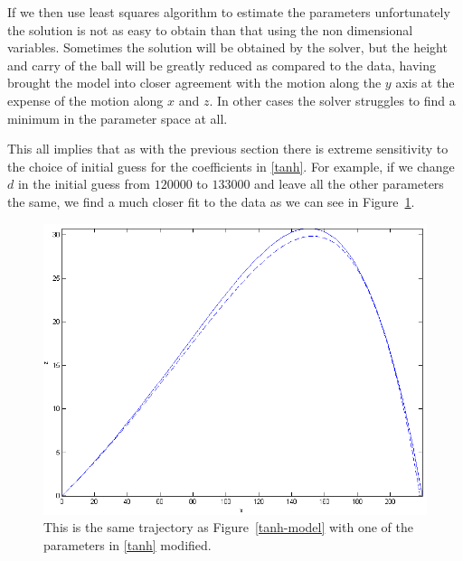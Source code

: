 If we then use least squares algorithm to estimate the parameters unfortunately the solution is not as easy to
obtain than that using the non dimensional variables. Sometimes the solution will be obtained
by the solver, but the height and carry of the ball will be greatly reduced as compared to the data, 
having brought the model into closer agreement with the motion along the $y$ axis at the expense of
the motion along $x$ and $z$. In other cases the solver struggles to find a minimum in the parameter
space at all.

This all implies that as with the previous section there is extreme sensitivity to the choice of 
initial guess for the coefficients in \eqref{tanh}. For example, if we change $d$ in the initial 
guess from $120000$ to $133000$ and leave all the other parameters the same, we find a much closer fit
to the data as we can see in Figure~\ref{tanh_guess2}.
\begin{figure}
\centering
\includegraphics[scale=0.7]{../images/tanh_guess2.png}
\caption[Running the same form as Figure~\ref{tanh-model} with a different value for $d$]{This is the
same trajectory as Figure~\ref{tanh-model} with one of the parameters in \eqref{tanh} modified.}
\label{tanh_guess2}
\end{figure}

